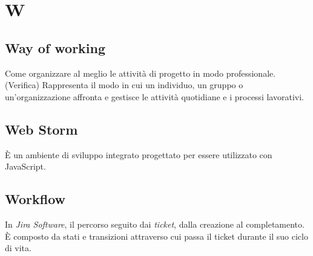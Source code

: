 \chapter{W}

\section{Way of working}\label{sec:WoW}
Come organizzare al meglio le attività di progetto in modo professionale.
(Verifica) Rappresenta il modo in cui un individuo, un gruppo o un'organizzazione affronta e gestisce le attività quotidiane e i processi lavorativi. 

\section{Web Storm}\label{sec:wstrm}
È un ambiente di sviluppo integrato progettato per essere utilizzato con JavaScript. 

\section{Workflow}
In \emph{Jira Software}, il percorso seguito dai \emph{ticket}, dalla creazione al completamento. È composto da stati e transizioni attraverso cui passa il ticket durante il suo ciclo di vita.

